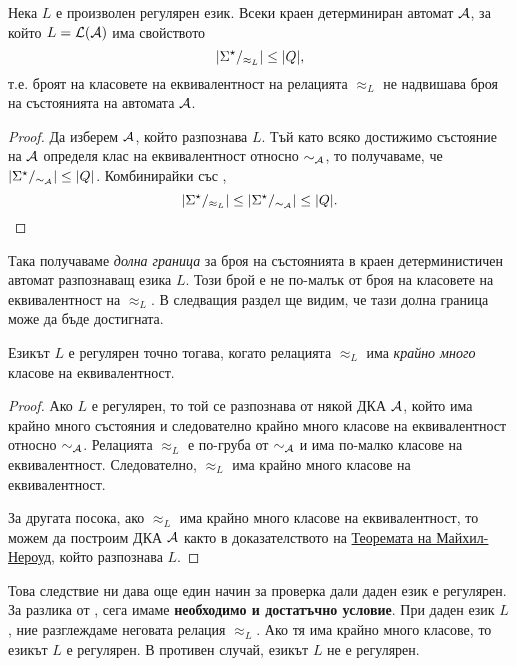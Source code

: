 \begin{framed}
  \begin{proposition}
    \label{pr:upper-bound}
    Нека $L$ е произволен регулярен език.
    Всеки краен детерминиран автомат $\mathcal{A}$, за който $L = \mathcal{L}(\mathcal{A})$ има свойството
    \[\vert{\Sigma^\star/_{\approx_L}}\vert \leq \vert{Q}\vert,\]
    т.е. броят на класовете на еквивалентност на релацията $\approx_L$
    не надвишава броя на състоянията на автомата $\mathcal{A}$.
  \end{proposition}  
\end{framed}
\begin{proof}
  Да изберем $\mathcal{A}$, който разпознава $L$. 
  Тъй като всяко достижимо състояние на $\mathcal{A}$ определя клас на еквивалентност относно $\sim_{\mathcal{A}}$,
  то получаваме, че $\vert{\Sigma^\star/_{\sim_{\mathcal{A}}}}\vert \leq |Q|$.
  Комбинирайки със ,
  \[\vert{\Sigma^\star/_{\approx_L}}\vert \leq \vert{\Sigma^\star/_{\sim_{\mathcal{A}}}}\vert \leq \vert{Q}\vert.\]
\end{proof}

Така получаваме {\em долна граница} за броя на състоянията в краен детерминистичен автомат разпознаващ езика $L$.
Този брой е не по-малък от броя на класовете на еквивалентност на $\approx_L$.
В следващия раздел ще видим, че тази долна граница може да бъде достигната.

\begin{framed}
  \begin{proposition}
    Езикът $L$ е регулярен точно тогава, когато релацията $\approx_L$ има {\em крайно много} класове на еквивалентност.
  \end{proposition}  
\end{framed}
\begin{proof}
  Ако $L$ е регулярен, то той се разпознава от някой ДКА $\mathcal{A}$, който има крайно много състояния 
  и следователно крайно много класове на еквивалентност относно $\sim_{\mathcal{A}}$.
  Релацията $\approx_L$ е по-груба от $\sim_{\mathcal{A}}$ и има по-малко класове на еквивалентност.
  Следователно, $\approx_L$ има крайно много класове на еквивалентност.
  
  За другата посока, ако $\approx_L$ има крайно много класове на еквивалентност, то можем да 
  построим ДКА $\mathcal{A}$ както в доказателството на \hyperref[th:myhill-nerode]{Теоремата на Майхил-Нероуд}, който разпознава $L$.
\end{proof}

Това следствие ни дава още един начин за проверка дали даден език е регулярен.
За разлика от , сега имаме {\bf необходимо и достатъчно условие}.
При даден език $L$, ние разглеждаме неговата релация $\approx_L$.
Ако тя има крайно много класове, то езикът $L$ е регулярен.
В противен случай, езикът $L$ не е регулярен.

